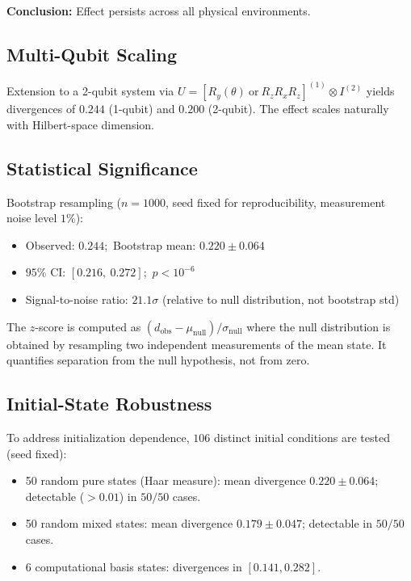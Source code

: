 \documentclass[12pt,a4paper]{article}
\begin{document}
\textbf{Conclusion:} Effect persists across all physical environments.

\subsection{Multi-Qubit Scaling}

Extension to a 2-qubit system via
$U = [R_y(\theta)\ \text{or}\ R_zR_xR_z]^{(1)}\otimes I^{(2)}$ yields
divergences of $0.244$ (1-qubit) and $0.200$ (2-qubit). The effect
scales naturally with Hilbert-space dimension.

\subsection{Statistical Significance}

Bootstrap resampling ($n = 1000$, seed fixed for reproducibility,
measurement noise level $1\%$):
\begin{itemize}
  \item Observed: $0.244$;\ Bootstrap mean: $0.220 \pm 0.064$
  \item $95\%$ CI: $[0.216,\ 0.272]$;\ $p < 10^{-6}$
  \item Signal-to-noise ratio: $21.1\sigma$ (relative to null distribution,
    not bootstrap std)
\end{itemize}

The $z$-score is computed as
$(d_{\mathrm{obs}} - \mu_{\mathrm{null}})/\sigma_{\mathrm{null}}$
where the null distribution is obtained by resampling two independent
measurements of the mean state. It quantifies separation from the null
hypothesis, not from zero.

\subsection{Initial-State Robustness}

To address initialization dependence, $106$ distinct initial conditions
are tested (seed fixed):
\begin{itemize}
  \item 50 random pure states (Haar measure):
    mean divergence $0.220 \pm 0.064$; detectable ($> 0.01$) in
    $50/50$ cases.
  \item 50 random mixed states: mean divergence $0.179 \pm 0.047$;
    detectable in $50/50$ cases.
  \item 6 computational basis states: divergences in $[0.141, 0.282]$.
\end{itemize}
\end{document}
